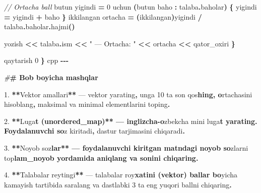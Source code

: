 \documentclass[a4paper,11pt,twoside,openright]{book}
\newenvironment{Shaded}{\begin{snugshade}}{\end{snugshade}}
\newcommand{\CharTok}[1]{\textcolor[rgb]{0.31,0.60,0.02}{#1}}
\newcommand{\CommentTok}[1]{\textcolor[rgb]{0.56,0.35,0.01}{\textit{#1}}}
\newcommand{\DecValTok}[1]{\textcolor[rgb]{0.00,0.00,0.81}{#1}}
\newcommand{\ErrorTok}[1]{\textcolor[rgb]{0.64,0.00,0.00}{\textbf{#1}}}
\newcommand{\FloatTok}[1]{\textcolor[rgb]{0.00,0.00,0.81}{#1}}
\newcommand{\NormalTok}[1]{#1}
\newcommand{\OperatorTok}[1]{\textcolor[rgb]{0.81,0.36,0.00}{\textbf{#1}}}
\newcommand{\PreprocessorTok}[1]{\textcolor[rgb]{0.56,0.35,0.01}{\textit{#1}}}
\newcommand{\StringTok}[1]{\textcolor[rgb]{0.31,0.60,0.02}{#1}}
\begin{document}
\begin{Shaded}
\begin{Highlighting}[]
        \CommentTok{// O\textquotesingle{}rtacha ball}
\NormalTok{        butun yigindi }\OperatorTok{=} \DecValTok{0}
\NormalTok{        uchun }\OperatorTok{(}\NormalTok{butun baho }\OperatorTok{:}\NormalTok{ talaba}\OperatorTok{.}\NormalTok{baholar}\OperatorTok{)} \OperatorTok{\{}
\NormalTok{            yigindi }\OperatorTok{=}\NormalTok{ yigindi }\OperatorTok{+}\NormalTok{ baho}
        \OperatorTok{\}}
\NormalTok{        ikkilangan ortacha }\OperatorTok{=} \OperatorTok{(}\NormalTok{ikkilangan}\OperatorTok{)}\NormalTok{yigindi }\OperatorTok{/}\NormalTok{ talaba}\OperatorTok{.}\NormalTok{baholar}\OperatorTok{.}\NormalTok{hajmi}\OperatorTok{()}

\NormalTok{        yozish }\OperatorTok{\textless{}\textless{}}\NormalTok{ talaba}\OperatorTok{.}\NormalTok{ism }\OperatorTok{\textless{}\textless{}} \StringTok{" — O\textquotesingle{}rtacha: "} \OperatorTok{\textless{}\textless{}}\NormalTok{ ortacha }\OperatorTok{\textless{}\textless{}}\NormalTok{ qator\_oxiri}
    \OperatorTok{\}}

\NormalTok{    qaytarish }\DecValTok{0}
\OperatorTok{\}}
\ErrorTok{\textasciigrave{}\textasciigrave{}\textasciigrave{}}\NormalTok{cpp}
\OperatorTok{{-}{-}{-}}

\PreprocessorTok{\#}\ErrorTok{\# Bob bo\textquotesingle{}yicha mashqlar}

\FloatTok{1.} \OperatorTok{**}\NormalTok{Vektor amallari}\OperatorTok{**}\NormalTok{ — vektor yarating}\OperatorTok{,}\NormalTok{ unga }\DecValTok{10}\NormalTok{ ta son qo}\CharTok{\textquotesingle{}s}\ErrorTok{hing, o}\CharTok{\textquotesingle{}}\NormalTok{rtachasini hisoblang}\OperatorTok{,}\NormalTok{ maksimal va minimal elementlarini toping}\OperatorTok{.}

\FloatTok{2.} \OperatorTok{**}\NormalTok{Lug}\CharTok{\textquotesingle{}a}\ErrorTok{t (unordered\_map)** — inglizcha{-}o}\CharTok{\textquotesingle{}}\NormalTok{zbekcha mini lug}\CharTok{\textquotesingle{}a}\ErrorTok{t yarating. Foydalanuvchi so}\CharTok{\textquotesingle{}}\NormalTok{z kiritadi}\OperatorTok{,}\NormalTok{ dastur tarjimasini chiqaradi}\OperatorTok{.}

\FloatTok{3.} \OperatorTok{**}\NormalTok{Noyob so}\CharTok{\textquotesingle{}z}\ErrorTok{lar** — foydalanuvchi kiritgan matndagi noyob so}\CharTok{\textquotesingle{}}\NormalTok{zlarni }\ErrorTok{\textasciigrave{}}\NormalTok{to}\CharTok{\textquotesingle{}p}\ErrorTok{lam\_noyob\textasciigrave{} yordamida aniqlang va sonini chiqaring.}

\FloatTok{4.} \OperatorTok{**}\NormalTok{Talabalar reytingi}\OperatorTok{**}\NormalTok{ — talabalar ro}\CharTok{\textquotesingle{}y}\ErrorTok{xatini (\textasciigrave{}vektor\textasciigrave{}) ballar bo}\CharTok{\textquotesingle{}}\NormalTok{yicha kamayish tartibida saralang va dastlabki }\DecValTok{3}\NormalTok{ ta eng yuqori ballni chiqaring}\OperatorTok{.}


\end{Highlighting}
\end{Shaded}
\end{document}
